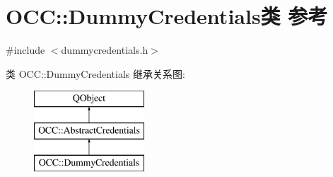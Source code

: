 \hypertarget{class_o_c_c_1_1_dummy_credentials}{}\section{O\+CC\+:\+:Dummy\+Credentials类 参考}
\label{class_o_c_c_1_1_dummy_credentials}


{\ttfamily \#include $<$dummycredentials.\+h$>$}

类 O\+CC\+:\+:Dummy\+Credentials 继承关系图\+:\begin{figure}[H]
\begin{center}
\leavevmode
\includegraphics[height=3.000000cm]{class_o_c_c_1_1_dummy_credentials}
\end{center}
\end{figure}

